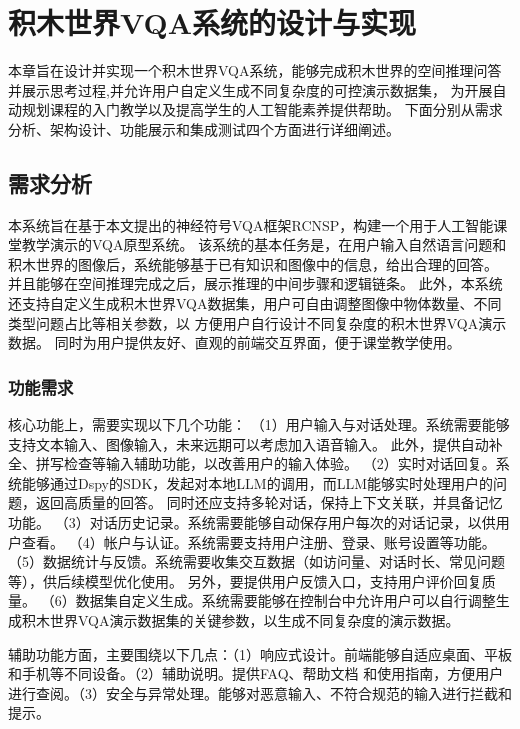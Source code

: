 \chapter{积木世界VQA系统的设计与实现}
本章旨在设计并实现一个积木世界VQA系统，能够完成积木世界的空间推理问答并展示思考过程,并允许用户自定义生成不同复杂度的可控演示数据集，
为开展自动规划课程的入门教学以及提高学生的人工智能素养提供帮助。
下面分别从需求分析、架构设计、功能展示和集成测试四个方面进行详细阐述。
\section{需求分析}
本系统旨在基于本文提出的神经符号VQA框架RCNSP，构建一个用于人工智能课堂教学演示的VQA原型系统。
该系统的基本任务是，在用户输入自然语言问题和积木世界的图像后，系统能够基于已有知识和图像中的信息，给出合理的回答。
并且能够在空间推理完成之后，展示推理的中间步骤和逻辑链条。
此外，本系统还支持自定义生成积木世界VQA数据集，用户可自由调整图像中物体数量、不同类型问题占比等相关参数，以
方便用户自行设计不同复杂度的积木世界VQA演示数据。
同时为用户提供友好、直观的前端交互界面，便于课堂教学使用。

\subsection{功能需求}
核心功能上，需要实现以下几个功能：
（1）用户输入与对话处理。系统需要能够支持文本输入、图像输入，未来远期可以考虑加入语音输入。
此外，提供自动补全、拼写检查等输入辅助功能，以改善用户的输入体验。
（2）实时对话回复。系统能够通过Dspy的SDK，发起对本地LLM的调用，而LLM能够实时处理用户的问题，返回高质量的回答。
同时还应支持多轮对话，保持上下文关联，并具备记忆功能。
（3）对话历史记录。系统需要能够自动保存用户每次的对话记录，以供用户查看。
（4）帐户与认证。系统需要支持用户注册、登录、账号设置等功能。
（5）数据统计与反馈。系统需要收集交互数据（如访问量、对话时长、常见问题等），供后续模型优化使用。
另外，要提供用户反馈入口，支持用户评价回复质量。
（6）数据集自定义生成。系统需要能够在控制台中允许用户可以自行调整生成积木世界VQA演示数据集的关键参数，以生成不同复杂度的演示数据。

辅助功能方面，主要围绕以下几点：（1）响应式设计。前端能够自适应桌面、平板和手机等不同设备。（2）辅助说明。提供FAQ、帮助文档
和使用指南，方便用户进行查阅。（3）安全与异常处理。能够对恶意输入、不符合规范的输入进行拦截和提示。

